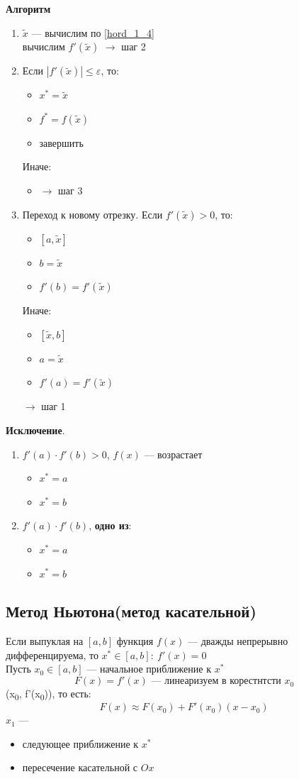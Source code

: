 \documentclass[oneside]{book}
\theoremstyle{plain}
\theoremstyle{remark}
\theoremstyle{definition}
\begin{document}
\textbf{Алгоритм}
\begin{enumerate}
\item \(\tilde{x}\) --- вычислим по \ref{hord_1_4} \\
вычислим \(f'(\tilde{x})\) \(\to\) шаг 2
\item Если \(|f'(\tilde{x})|\le\varepsilon\), то:
\begin{itemize}
\item \(x^* = \tilde{x}\)
\item \(f^* = f(\tilde{x})\)
\item завершить
\end{itemize}
Иначе:
\begin{itemize}
\item \(\to\) шаг 3
\end{itemize}
\item Переход к новому отрезку. Если \(f'(\tilde{x}) > 0\), то:
\begin{itemize}
\item \([a, \tilde{x}]\)
\item \(b = \tilde{x}\)
\item \(f'(b) = f'(\tilde{x})\)
\end{itemize}
Иначе:
\begin{itemize}
\item \([\tilde{x}, b]\)
\item \(a = \tilde{x}\)
\item \(f'(a) = f'(\tilde{x})\)
\end{itemize}
\(\to\) шаг 1
\end{enumerate}
\textbf{Исключение}.
\begin{enumerate}
\item \(f'(a)\cdot f'(b) > 0\), \(f(x)\) --- возрастает
\begin{itemize}
\item \(x^* = a\)
\item \(x^* = b\)
\end{itemize}
\item \(f'(a)\cdot f'(b)\), \textbf{одно из}:
\begin{itemize}
\item \(x^* = a\)
\item \(x^* = b\)
\end{itemize}
\end{enumerate}
\subsection{Метод Ньютона(метод касательной)}
\label{sec:org3afdbbe}
Если выпуклая на \([a, b]\) функция \(f(x)\) --- дважды непрерывно
дифференцируема, то \(x^* \in [a, b]:\ f'(x) = 0\) \\
Пусть \(x_0 \in [a, b]\) --- начальное приближение к \(x^*\)
\[ F(x) = f'(x)\text{ --- линеаризуем в корестнтсти } x_0 \]
(x\textsubscript{0}, f'(x\textsubscript{0})), то есть:
\[ F(x) \approx F(x_0) + F'(x_0)(x - x_0) \]
\(x_1\) ---
\begin{itemize}
\item следующее приближение к \(x^*\)
\item пересечение касательной с \(Ox\)
\end{itemize}
\end{document}
